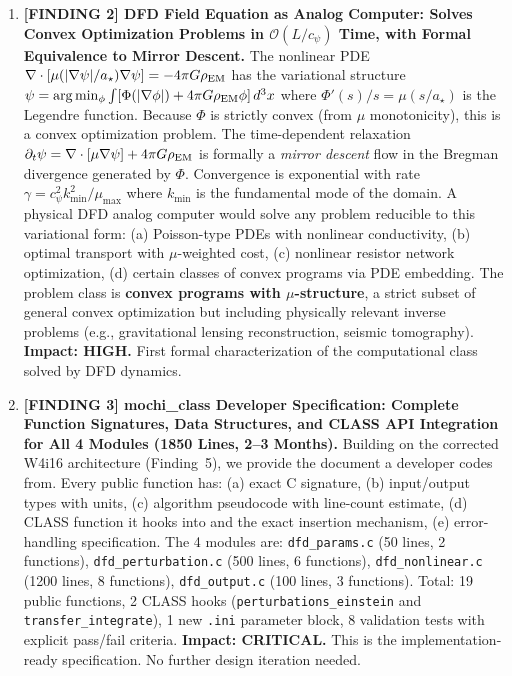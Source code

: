 \documentclass[11pt]{article}
\theoremstyle{definition}
\theoremstyle{remark}
\newcommand{\astar}{a_\star}
\begin{document}
\begin{tcolorbox}[colback=blue!5!white, colframe=blue!60!black,
  title=\textbf{W4i17 TOP 5 FINDINGS --- READ FIRST}]
\begin{enumerate}[nosep]
\item \textbf{[FINDING 2] DFD Field Equation as Analog Computer:
  Solves Convex Optimization Problems in $\mathcal{O}(L/c_\psi)$ Time,
  with Formal Equivalence to Mirror Descent.}
  The nonlinear PDE $\nabla \cdot [\mu(|\nabla\psi|/\astar)\nabla\psi]
  = -4\pi G \rho_{\rm EM}$ has the variational structure
  $\psi = \arg\min_\phi \int [\Phi(|\nabla\phi|) + 4\pi G\rho_{\rm EM}\phi]
  \,d^3x$ where $\Phi'(s)/s = \mu(s/\astar)$ is the Legendre function.
  Because $\Phi$ is strictly convex (from $\mu$ monotonicity), this
  is a convex optimization problem. The time-dependent relaxation
  $\partial_t \psi = \nabla \cdot [\mu \nabla\psi] + 4\pi G\rho_{\rm EM}$
  is formally a \emph{mirror descent} flow in the Bregman divergence
  generated by $\Phi$. Convergence is exponential with rate
  $\gamma = c_\psi^2 k_{\min}^2 / \mu_{\max}$ where $k_{\min}$
  is the fundamental mode of the domain. A physical DFD analog
  computer would solve any problem reducible to this variational form:
  (a) Poisson-type PDEs with nonlinear conductivity,
  (b) optimal transport with $\mu$-weighted cost,
  (c) nonlinear resistor network optimization,
  (d) certain classes of convex programs via PDE embedding.
  The problem class is \textbf{convex programs with $\mu$-structure},
  a strict subset of general convex optimization but including
  physically relevant inverse problems (e.g., gravitational lensing
  reconstruction, seismic tomography).
  \textbf{Impact: HIGH.} First formal characterization of the
  computational class solved by DFD dynamics.

\item \textbf{[FINDING 3] mochi\_class Developer Specification:
  Complete Function Signatures, Data Structures, and CLASS API
  Integration for All 4 Modules (1850 Lines, 2--3 Months).}
  Building on the corrected W4i16 architecture (Finding~5),
  we provide the document a developer codes from. Every public
  function has: (a) exact C signature, (b) input/output types with
  units, (c) algorithm pseudocode with line-count estimate,
  (d) CLASS function it hooks into and the exact insertion mechanism,
  (e) error-handling specification.
  The 4 modules are:
  \texttt{dfd\_params.c} (50 lines, 2 functions),
  \texttt{dfd\_perturbation.c} (500 lines, 6 functions),
  \texttt{dfd\_nonlinear.c} (1200 lines, 8 functions),
  \texttt{dfd\_output.c} (100 lines, 3 functions).
  Total: 19 public functions, 2 CLASS hooks
  (\texttt{perturbations\_einstein} and \texttt{transfer\_integrate}),
  1 new \texttt{.ini} parameter block, 8 validation tests with
  explicit pass/fail criteria.
  \textbf{Impact: CRITICAL.} This is the implementation-ready
  specification. No further design iteration needed.


\end{enumerate}
\end{tcolorbox}
\end{document}
